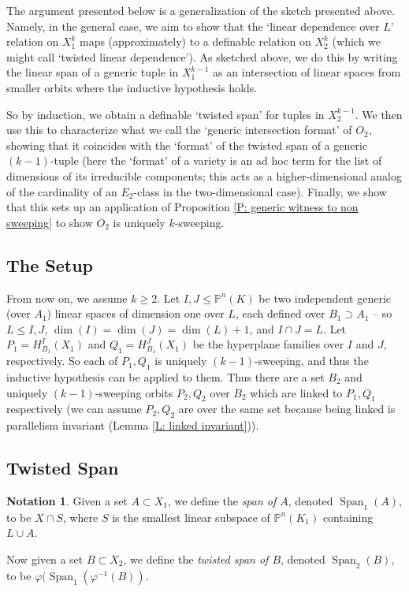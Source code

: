 \documentclass{amsart}
\theoremstyle{definition}
\newtheorem{notation}[theorem]{Notation}
\begin{document}
The argument presented below is a generalization of the sketch presented above. Namely, in the general case, we aim to show that the `linear dependence over $L$' relation on $X_1^k$ maps (approximately) to a definable relation on $X_2^k$ (which we might call `twisted linear dependence'). As sketched above, we do this by writing the linear span of a generic tuple in $X_1^{k-1}$ as an intersection of linear spaces from smaller orbits where the inductive hypothesis holds.

So by induction, we obtain a definable `twisted span' for tuples in $X_2^{k-1}$. We then use this to characterize what we call the `generic intersection format' of $O_2$, showing that it coincides with the `format' of the twisted span of a generic $(k-1)$-tuple (here the `format' of a variety is an ad hoc term for the list of dimensions of its irreducible components; this acts as a higher-dimensional analog of the cardinality of an $E_2$-class in the two-dimensional case). Finally, we show that this sets up an application of Proposition \ref{P: generic witness to non sweeping} to show $O_2$ is uniquely $k$-sweeping. 

\subsection{The Setup}

From now on, we assume $k\geq 2$. Let $I,J\leq\mathbb P^n(K)$ be two independent generic (over $A_1$) linear spaces of dimension one over $L$, each defined over $B_1\supset A_1$ -- so $L\leq I,J$, $\dim(I)=\dim(J)=\dim(L)+1$, and $I\cap J=L$. Let $P_1=H_{B_1}^I(X_1)$ and $Q_1=H_{B_1}^J(X_1)$ be the hyperplane families over $I$ and $J$, respectively. So each of $P_1,Q_1$ is uniquely $(k-1)$-sweeping, and thus the inductive hypothesis can be applied to them. Thus there are a set $B_2$ and uniquely $(k-1)$-sweeping orbits $P_2,Q_2$ over $B_2$ which are linked to $P_1,Q_1$ respectively (we can assume $P_2,Q_2$ are over the same set because being linked is parallelism invariant (Lemma \ref{L: linked invariant})).

    \subsection{Twisted Span}

    \begin{notation}
        Given a set $A\subset X_1$, we define the \textit{span of $A$}, denoted $\operatorname{Span}_1(A)$, to be $X\cap S$, where $S$ is the smallest linear subspace of $\mathbb P^n(K_1)$ containing $L\cup A$.
        
        Now given a set $B\subset X_2$, we define the \textit{twisted span of $B$}, denoted $\operatorname{Span}_2(B)$, to be $\varphi(\operatorname{Span}_1(\varphi^{-1}(B))$.
    \end{notation}
\end{document}
